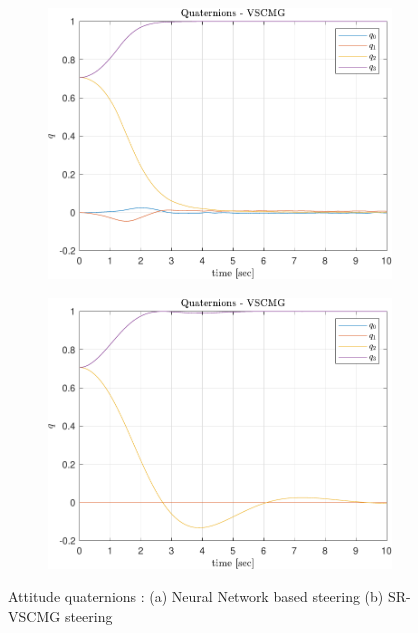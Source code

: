 \begin{figure}[ht]
     \centering
     \begin{subfigure}[b]{0.49\textwidth}
         \centering
         \includegraphics[width=\textwidth]{figures/plots/Results/vs-nn-q.pdf}
         \caption{}
         \label{fig:nn_q}
     \end{subfigure}
     \begin{subfigure}[b]{0.49\textwidth}
         \centering
         \includegraphics[width=\textwidth]{figures/plots/Results/vs-vs-q.pdf}
         \caption{}
         \label{fig:vs_q}
     \end{subfigure}
        \caption{Attitude quaternions : (a) Neural Network based steering (b) SR-VSCMG steering}
        \label{fig:nnvscmg_q}
\end{figure}

